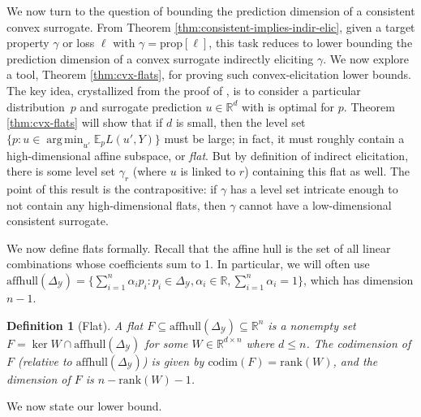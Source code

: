 \documentclass{article}
\newcommand{\reals}{\mathbb{R}}
\newcommand{\simplex}{\Delta_\Y}
\newcommand{\prop}[1]{\mathrm{prop}[#1]}
\newcommand{\codim}{\mathrm{codim}}
\newcommand{\affhull}{\mathrm{affhull}}
\newcommand{\E}{\mathbb{E}}
\newcommand{\Y}{\mathcal{Y}}
\newcommand{\exploss}[3]{\E_{#3} #1(#2,Y)}
\newtheorem{definition}{Definition}
\DeclareMathOperator*{\argmin}{arg\,min}
\begin{document}
We now turn to the question of bounding the prediction dimension of a consistent convex surrogate.
From Theorem \ref{thm:consistent-implies-indir-elic}, given a target property $\gamma$ or loss $\ell$ with $\gamma = \prop{\ell}$, this task reduces to lower bounding the prediction dimension of a convex surrogate indirectly eliciting $\gamma$.
We now explore a tool, Theorem \ref{thm:cvx-flats}, for proving such convex-elicitation lower bounds.
The key idea, crystallized from the proof of \citet[Theorem 16]{ramaswamy2016convex}, is to consider a particular distribution~$p$ and surrogate prediction $u \in \reals^d$ with is optimal for $p$.
Theorem \ref{thm:cvx-flats} will show that if $d$ is small, then the level set $\{p : u \in \argmin_{u'} \exploss{L}{u'}{p}\}$ must be large; in fact, it must roughly contain a high-dimensional affine subspace, or \emph{flat}.
But by definition of indirect elicitation, there is some level set $\gamma_r$ (where $u$ is linked to $r$) containing this flat as well.
The point of this result is the contrapositive: if $\gamma$ has a level set intricate enough to not contain any high-dimensional flats, then $\gamma$ cannot have a low-dimensional consistent surrogate.

We now define flats formally.
Recall that the affine hull is the set of all linear combinations whose coefficients sum to 1.
In particular, we will often use $\affhull(\simplex) = \{\sum_{i=1}^n \alpha_i p_i : p_i \in \simplex, \alpha_i \in \reals, \sum_{i=1}^n \alpha_i = 1\}$, which has dimension $n-1$.
\begin{definition}[Flat]\label{def:flat}
	A \emph{flat} $F \subseteq \affhull(\simplex) \subseteq \reals^n$ is a nonempty set $F = \ker W \cap \affhull(\simplex)$ for some $W\in\reals^{d\times n}$ where $d\leq n$.
	The codimension of $F$ (relative to $\affhull(\simplex)$) is given by $\codim(F)=\mathrm{rank}(W)$, and the dimension of $F$ is $n - \mathrm{rank}(W) - 1$.
\end{definition}


We now state our lower bound.
\end{document}
